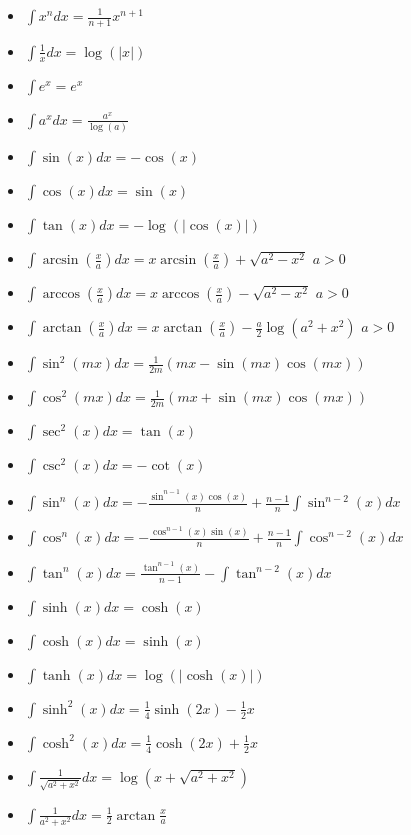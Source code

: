 \documentclass[12pt]{article}
\newcommand{\abs}[1]{\left\vert #1 \right\vert}
\begin{document}
\begin{multicols}{3}

\begin{itemize}
	\item $\int x^n dx = \frac{1}{n+1}x^{n+1}$
	\item $\int \frac{1}{x} dx = \log(\abs{x})$
	\item $\int e^x = e^x$
	\item $\int a^x dx = \frac{a^x}{\log(a)}$
	\item $\int \sin(x)dx = -\cos(x)$
	\item $\int \cos(x)dx = \sin(x)$
	\item $\int \tan(x)dx = -\log(\abs{\cos(x)})$
	\item $\int \arcsin\left( \frac{x}{a} \right)dx = x\arcsin\left(\frac{x}{a} \right)
		+ \sqrt{a^2 - x^2}$ $a > 0$
	\item $\int \arccos\left( \frac{x}{a}\right)dx = x\arccos\left(\frac{x}{a} \right)
		- \sqrt{a^2 - x^2}$ $a > 0$
	\item $\int \arctan\left( \frac{x}{a}\right)dx = x\arctan\left(\frac{x}{a} \right)
		- \frac{a}{2} \log\left(a^2+ x^2\right)$ $a > 0$
	\item $\int \sin^2(mx)dx = \frac{1}{2m}(mx-\sin(mx)\cos(mx))$
	\item $\int \cos^2(mx)dx = \frac{1}{2m}(mx+ \sin(mx)\cos(mx))$
	\item $\int \sec^2(x)dx = \tan(x)$
	\item $\int \csc^2(x)dx = -\cot(x)$
	\item $\int \sin^n(x)dx = - \frac{\sin^{n-1}(x)\cos(x)}{n} +
		\frac{n-1}{n}\int \sin^{n-2}(x)dx$
	\item $\int \cos^n(x)dx = - \frac{\cos^{n-1}(x)\sin(x)}{n} +
		\frac{n-1}{n}\int \cos^{n-2}(x)dx$
	\item $\int \tan^n(x)dx = \frac{\tan^{n-1}(x)}{n-1} - \int \tan^{n-2}(x)dx$
	\item $\int \sinh(x)dx = \cosh(x)$
	\item $\int \cosh(x)dx = \sinh(x)$
	\item $\int \tanh(x)dx = \log(\abs{\cosh(x)})$
	\item $\int \sinh^2(x)dx = \frac{1}{4}\sinh(2x) - \frac{1}{2}x$
	\item $\int \cosh^2(x)dx = \frac{1}{4}\cosh(2x) + \frac{1}{2}x$
	\item $\int \frac{1}{\sqrt{a^2 + x^2}}dx = \log \left( x + \sqrt{a^2 + x^2} \right)$
	\item $\int \frac{1}{a^2 + x^2}dx = \frac{1}{2}\arctan\frac{x}{a}$

\end{itemize}
\end{multicols}
\end{document}

